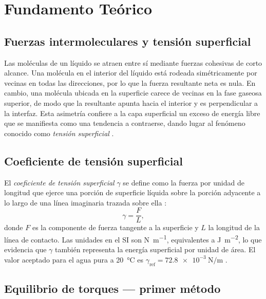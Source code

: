 
\section{Fundamento Teórico}

\subsection{Fuerzas intermoleculares y tensión superficial}

Las moléculas de un líquido se atraen entre sí mediante fuerzas cohesivas de
corto alcance. Una molécula en el interior del líquido está rodeada
simétricamente por vecinas en todas las direcciones, por lo que la fuerza
resultante neta es nula. En cambio, una molécula ubicada en la superficie
carece de vecinas en la fase gaseosa superior, de modo que la resultante apunta
hacia el interior y es perpendicular a la interfaz. Esta asimetría confiere a
la capa superficial un exceso de energía libre que se manifiesta como una
tendencia a contraerse, dando lugar al fenómeno conocido como \textit{tensión
superficial} \cite{serway}.

\subsection{Coeficiente de tensión superficial}

El \textit{coeficiente de tensión superficial} $\gamma$ se define como la
fuerza por unidad de longitud que ejerce una porción de superficie líquida
sobre la porción adyacente a lo largo de una línea imaginaria trazada sobre
ella \cite{halliday}:
\begin{equation}
    \gamma = \frac{F}{L},
    \label{eq:gamma_def}
\end{equation}
donde $F$ es la componente de fuerza tangente a la superficie y $L$ la
longitud de la línea de contacto. Las unidades en el SI son
\unit{\newton\per\meter}, equivalentes a \unit{\joule\per\meter\squared}, lo
que evidencia que $\gamma$ también representa la energía superficial por unidad
de área. El valor aceptado para el agua pura a \SI{20}{\celsius} es
$\gamma_{\text{ref}} = \SI{72.8e-3}{\newton\per\meter}$ \cite{serway}.

\subsection{Equilibrio de torques — primer método}

